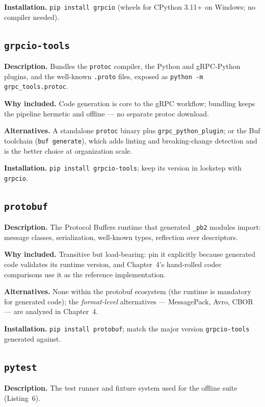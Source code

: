 \textbf{Installation.} \texttt{pip install grpcio} (wheels for CPython 3.11+
on Windows; no compiler needed).

\subsection{\texttt{grpcio-tools}}

\textbf{Description.} Bundles the \texttt{protoc} compiler, the Python and
gRPC-Python plugins, and the well-known \texttt{.proto} files, exposed as
\texttt{python -m grpc\_tools.protoc}.

\textbf{Why included.} Code generation is core to the gRPC workflow; bundling
keeps the pipeline hermetic and offline --- no separate protoc download.

\textbf{Alternatives.} A standalone \texttt{protoc} binary plus
\texttt{grpc\_python\_plugin}; or the Buf toolchain (\texttt{buf generate}),
which adds linting and breaking-change detection and is the better choice at
organization scale.

\textbf{Installation.} \texttt{pip install grpcio-tools}; keep its version in
lockstep with \texttt{grpcio}.

\subsection{\texttt{protobuf}}

\textbf{Description.} The Protocol Buffers runtime that generated
\texttt{\_pb2} modules import: message classes, serialization, well-known
types, reflection over descriptors.

\textbf{Why included.} Transitive but load-bearing: pin it explicitly because
generated code validates its runtime version, and Chapter~4's hand-rolled codec
comparisons use it as the reference implementation.

\textbf{Alternatives.} None within the protobuf ecosystem (the runtime is
mandatory for generated code); the \emph{format-level} alternatives ---
MessagePack, Avro, CBOR --- are analyzed in Chapter~4.

\textbf{Installation.} \texttt{pip install protobuf}; match the major version
\texttt{grpcio-tools} generated against.

\subsection{\texttt{pytest}}

\textbf{Description.} The test runner and fixture system used for the offline
suite (Listing~6).

